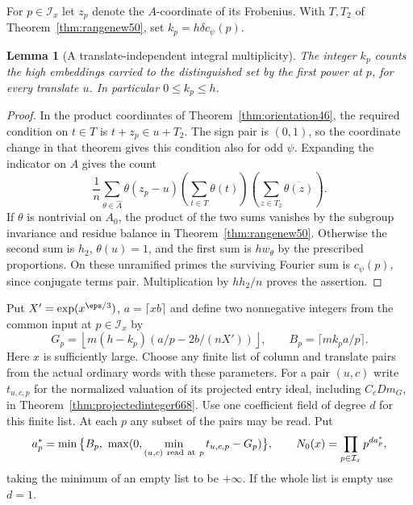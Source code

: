 \documentclass[a4paper,11pt]{article}
\newtheorem{lemma}[proposition]{Lemma}
\theoremstyle{definition}
\theoremstyle{remark}
\numberwithin{equation}{section}
\begin{document}
For \(p\in\mathcal I_x\) let \(z_p\) denote the \(A\)-coordinate
of its Frobenius. With \(T,T_2\) of
Theorem~\ref{thm:rangenew50}, set \(k_p=h\delta c_\psi(p)\).

\begin{lemma}[A translate-independent integral multiplicity]
\leavevmode\label{lem:primeincidence670}
The integer \(k_p\) counts the high embeddings carried to the
distinguished set by the first power at \(p\), for every
translate \(u\). In particular \(0\le k_p\le h\).
\end{lemma}
\begin{proof}
In the product coordinates of Theorem~\ref{thm:orientation46},
the required condition on \(t\in T\) is \(t+z_p\in u+T_2\).
The sign pair is \((0,1)\), so the coordinate change in that
theorem gives this condition also for odd \(\psi\). Expanding
the indicator on \(A\) gives the count
\[
 \frac1n\sum_{\theta\in\widehat A}\theta(z_p-u)
       \left(\sum_{t\in T}\theta(t)\right)
       \left(\sum_{z\in T_2}\overline{\theta(z)}\right).
\]
If \(\theta\) is nontrivial on \(A_0\), the product of the two
sums vanishes by the subgroup invariance and residue balance in
Theorem~\ref{thm:rangenew50}. Otherwise the second sum is \(h_2\),
\(\theta(u)=1\), and the first sum is \(hw_\theta\) by the
prescribed proportions. On these unramified primes the surviving
Fourier sum is \(c_\psi(p)\), since conjugate terms pair.
Multiplication by \(hh_2/n\) proves the assertion.
\end{proof}

Put \(X'=\exp(x^{\eps/3})\), \(a=\lceil xb\rceil\) and define
two nonnegative integers from the common input at \(p\in\mathcal I_x\) by
\[
 G_p=\left\lfloor m(h-k_p)\left(a/p-2b/(nX')\right)\right\rfloor,
 \qquad B_p=\lceil m k_p a/p\rceil .
\]
Here \(x\) is sufficiently large. Choose any finite list of column
and translate pairs from the actual ordinary words with these
parameters. For a pair \((u,c)\) write \(t_{u,c,p}\) for the
normalized valuation of its projected entry ideal, including
\(C_cDm_G\), in Theorem~\ref{thm:projectedinteger668}.
Use one coefficient field of degree \(d\) for this finite list.
At each \(p\) any subset of the pairs may be read. Put
\[
 a_p^*=\min\big\{B_p,\ \max(0,\min_{(u,c)\ {\rm read\ at}\ p}
                                   t_{u,c,p}-G_p)\big\},\qquad
 N_0(x)=\prod_{p\in\mathcal I_x}p^{d a_p^*},
\]
taking the minimum of an empty list to be \(+\infty\).
If the whole list is empty use \(d=1\).
\end{document}
